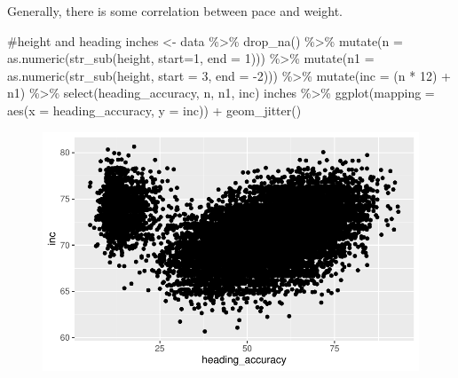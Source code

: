 \documentclass[
  letterpaper,
  DIV=11,
  numbers=noendperiod]{scrartcl}
\newenvironment{Shaded}{\begin{snugshade}}{\end{snugshade}}
\newcommand{\AttributeTok}[1]{\textcolor[rgb]{0.40,0.45,0.13}{#1}}
\newcommand{\CommentTok}[1]{\textcolor[rgb]{0.37,0.37,0.37}{#1}}
\newcommand{\DecValTok}[1]{\textcolor[rgb]{0.68,0.00,0.00}{#1}}
\newcommand{\FunctionTok}[1]{\textcolor[rgb]{0.28,0.35,0.67}{#1}}
\newcommand{\NormalTok}[1]{\textcolor[rgb]{0.00,0.23,0.31}{#1}}
\newcommand{\OtherTok}[1]{\textcolor[rgb]{0.00,0.23,0.31}{#1}}
\newcommand{\SpecialCharTok}[1]{\textcolor[rgb]{0.37,0.37,0.37}{#1}}
\newcommand{\StringTok}[1]{\textcolor[rgb]{0.13,0.47,0.30}{#1}}
\begin{document}
Generally, there is some correlation between pace and weight.

\begin{Shaded}
\begin{Highlighting}[]
\CommentTok{\#height and heading}
\NormalTok{inches }\OtherTok{\textless{}{-}}\NormalTok{ data }\SpecialCharTok{\%\textgreater{}\%}
  \FunctionTok{drop\_na}\NormalTok{() }\SpecialCharTok{\%\textgreater{}\%}
  \FunctionTok{mutate}\NormalTok{(}\StringTok{\textquotesingle{}n\textquotesingle{}} \OtherTok{=} \FunctionTok{as.numeric}\NormalTok{(}\FunctionTok{str\_sub}\NormalTok{(height, }\AttributeTok{start=}\DecValTok{1}\NormalTok{, }\AttributeTok{end =} \DecValTok{1}\NormalTok{))) }\SpecialCharTok{\%\textgreater{}\%} 
  \FunctionTok{mutate}\NormalTok{(}\StringTok{\textquotesingle{}n1\textquotesingle{}} \OtherTok{=} \FunctionTok{as.numeric}\NormalTok{(}\FunctionTok{str\_sub}\NormalTok{(height, }\AttributeTok{start =} \DecValTok{3}\NormalTok{, }\AttributeTok{end =} \SpecialCharTok{{-}}\DecValTok{2}\NormalTok{))) }\SpecialCharTok{\%\textgreater{}\%}
  \FunctionTok{mutate}\NormalTok{(}\StringTok{\textquotesingle{}inc\textquotesingle{}} \OtherTok{=}\NormalTok{ (n }\SpecialCharTok{*} \DecValTok{12}\NormalTok{) }\SpecialCharTok{+}\NormalTok{ n1) }\SpecialCharTok{\%\textgreater{}\%}
  \FunctionTok{select}\NormalTok{(heading\_accuracy, n,  n1, inc)}
\NormalTok{inches }\SpecialCharTok{\%\textgreater{}\%} 
  \FunctionTok{ggplot}\NormalTok{(}\AttributeTok{mapping =} \FunctionTok{aes}\NormalTok{(}\AttributeTok{x =}\NormalTok{ heading\_accuracy, }\AttributeTok{y =}\NormalTok{ inc)) }\SpecialCharTok{+}
  \FunctionTok{geom\_jitter}\NormalTok{()}
\end{Highlighting}
\end{Shaded}

\begin{figure}[H]

{\centering \includegraphics{FIFA21_files/figure-pdf/unnamed-chunk-16-1.pdf}

}

\end{figure}
\end{document}
